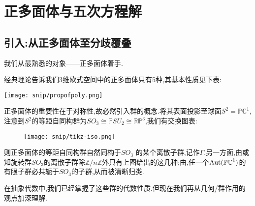 
\chapter{正多面体与五次方程解}




\section{引入:从正多面体至分歧覆叠}
我们从最熟悉的对象——正多面体着手.

经典理论告诉我们3维欧式空间中的正多面体只有5种,其基本性质见下表:
\begin{table}[ht]
	\texttt{[image: snip/propofpoly.png]}
\end{table}

	正多面体的重要性在于对称性,故必然引入群的概念.将其表面投影至球面$S^2=\mathbb{P}\mathbb{C}^1$,注意到$S^2$的等距自同构群为$SO_3\cong \mathbb{P}SU_2 \cong\mathbb{R}\mathbb{P}^3$,我们有交换图表:
\begin{figure}[ht]
	\centering
	\texttt{[image: snip/tikz-iso.png]}
\end{figure}
		
		
		则正多面体的等距自同构群自然同构于$SO_3$ 的某个离散子群,记作$\Gamma$.另一方面,由\cite[5.9.1]{artin2011algebra}或\cite[2.6]{shurman1997geometry}知旋转群$SO_3$的离散子群除$\mathbb{Z}/n\mathbb{Z}$外只有上图给出的这几种;由\cite{shurman1997geometry},任一个$\operatorname{Aut} (\mathbb{PC}^1)$的有限子群必共轭于$SO_3$的子群,从而被清晰归类.
		

		在抽象代数中,我们已经掌握了这些群的代数性质.但现在我们再从几何/群作用的观点加深理解.
		

